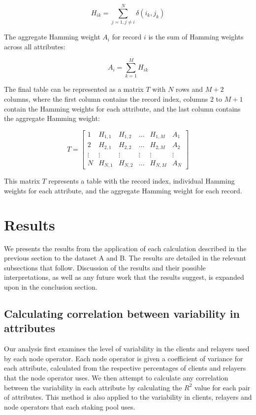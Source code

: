 \documentclass[conference]{IEEEtran}
\begin{document}
\[ H_{ik} = \sum_{j=1, j\neq i}^{N} \delta \left( i_k,j_k \right) \]

The aggregate Hamming weight \( A_{i} \) for record \( i \) is the sum of Hamming weights across all attributes:

\[ A_{i} = \sum_{k=1}^{M} H_{ik} \]

The final table can be represented as a matrix \( T \) with \( N \) rows and \( M+2 \) columns, where the first column contains the record index, columns \( 2 \) to \( M+1 \) contain the Hamming weights for each attribute, and the last column contains the aggregate Hamming weight:

\[ T = \begin{bmatrix} 
1 & H_{1,1} & H_{1,2} & \ldots & H_{1,M} & A_{1} \\
2 & H_{2,1} & H_{2,2} & \ldots & H_{2,M} & A_{2} \\
\vdots & \vdots & \vdots & \vdots & \vdots & \vdots \\
N & H_{N,1} & H_{N,2} & \ldots & H_{N,M} & A_{N}
\end{bmatrix} \]

\vspace{2pt}

This matrix \( T \) represents a table with the record index, individual Hamming weights for each attribute, and the aggregate Hamming weight for each record.

\section{Results}
\label{sec:results}

We presents the results from the application of each calculation described in the previous section to the dataset A and B.  The results are detailed in the relevant subsections that follow.  Discussion of the results and their possible interpretations, as well as any future work that the results suggest, is expanded upon in the conclusion section.

\subsection{Calculating correlation between variability in attributes}

Our analysis first examines the level of variability in the clients and relayers used by each node operator.  Each node operator is given a coefficient of variance for each attribute, calculated from the respective percentages of clients and relayers that the node operator uses. We then attempt to calculate any correlation between the variability in each attribute by calculating the $R^2$ value for each pair of attributes.  This method is also applied to the variability in clients, relayers and node operators that each staking pool uses.
\end{document}
